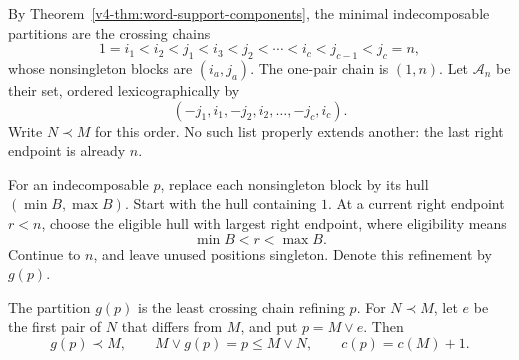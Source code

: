 By Theorem~\ref{v4-thm:word-support-components},
the minimal indecomposable partitions are
the crossing chains
\[
 1=i_1<i_2<j_1<i_3<j_2<\cdots
                         <i_c<j_{c-1}<j_c=n,
\]
whose nonsingleton blocks are \((i_a,j_a)\).
The one-pair chain is \((1,n)\).
Let \(\mathcal A_n\) be their set,
ordered lexicographically by
\begin{equation}\label{v4-eq:singular-vacuum-order}
              (-j_1,i_1,-j_2,i_2,\ldots,-j_c,i_c).
\end{equation}
Write \(N\prec M\) for this order.
No such list properly extends another:
the last right endpoint is already \(n\).

For an indecomposable \(p\), replace each
nonsingleton block by its hull
\((\min B,\max B)\).
Start with the hull containing \(1\).
At a current right endpoint \(r<n\),
choose the eligible hull with largest right
endpoint, where eligibility means
\[
                         \min B<r<\max B.
\]
Continue to \(n\), and leave unused
positions singleton. Denote this refinement
by \(g(p)\).

\begin{lemma}\label{v4-lem:singular-greedy-exchange}
The partition \(g(p)\) is the least
crossing chain refining \(p\).
For \(N\prec M\), let \(e\) be the
first pair of \(N\) that differs from \(M\),
and put \(p=M\vee e\).
Then
\begin{equation}\label{v4-eq:singular-greedy-exchange}
 g(p)\prec M,\qquad M\vee g(p)=p\leq M\vee N,
 \qquad c(p)=c(M)+1.
\end{equation}
\end{lemma}

